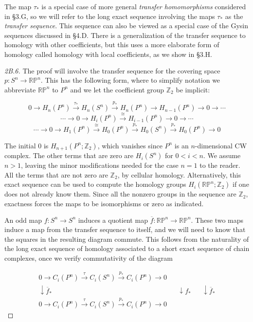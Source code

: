 The map $\tau_*$ is a special case of more general \textit{transfer homomorphisms} considered in \S3.G, so we will refer to the long exact sequence involving the maps $\tau_*$ as the \textit{transfer sequence}. This sequence can also be viewed as a special case of the Gysin sequences discussed in \S4.D. There is a generalization of the transfer sequence to homology with other coefficients, but this uses a more elaborate form of homology called homology with local coefficients, as we show in \S3.H.
\begin{proof}[2B.6]
 The proof will involve the transfer sequence for the covering space $p : S^n \to \mathbb{RP}^n$. This has the following form, where to simplify notation we abbreviate $\mathbb{RP}^n$ to $P^n$ and we let the coefficient group $\mathbb{Z}_2$ be implicit:

\[
0 \longrightarrow H_n(P^n) \xrightarrow{\tau_*} H_n(S^n) \xrightarrow{p_*} H_n(P^n) \longrightarrow H_{n-1}(P^n) \longrightarrow 0 \longrightarrow \cdots
\]
\[
\cdots \longrightarrow 0 \longrightarrow H_i(P^n) \xrightarrow{\cong} H_{i-1}(P^n) \longrightarrow 0 \longrightarrow \cdots
\]
\[
\cdots \longrightarrow 0 \longrightarrow H_1(P^n) \xrightarrow{\cong} H_0(P^n) \xrightarrow{p_*} H_0(S^n) \xrightarrow{p_*} H_0(P^n) \longrightarrow 0
\]

The initial $0$ is $H_{n+1}(P^n; \mathbb{Z}_2)$, which vanishes since $P^n$ is an $n$-dimensional CW complex. The other terms that are zero are $H_i(S^n)$ for $0 < i < n$. We assume $n > 1$, leaving the minor modifications needed for the case $n = 1$ to the reader. All the terms that are not zero are $\mathbb{Z}_2$, by cellular homology. Alternatively, this exact sequence can be used to compute the homology groups $H_i(\mathbb{RP}^n; \mathbb{Z}_2)$ if one does not already know them. Since all the nonzero groups in the sequence are $\mathbb{Z}_2$, exactness forces the maps to be isomorphisms or zero as indicated.

An odd map $f : S^n \to S^n$ induces a quotient map $\overline{f} : \mathbb{RP}^n \to \mathbb{RP}^n$. These two maps induce a map from the transfer sequence to itself, and we will need to know that the squares in the resulting diagram commute. This follows from the naturality of the long exact sequence of homology associated to a short exact sequence of chain complexes, once we verify commutativity of the diagram

\[
\begin{array}{ccccc}
0 \longrightarrow C_i(P^n) \xrightarrow{\tau} C_i(S^n) \xrightarrow{p_*} C_i(P^n) \longrightarrow 0 \\
\downarrow \overline{f}_* & & \downarrow f_* & & \downarrow \overline{f}_* \\
0 \longrightarrow C_i(P^n) \xrightarrow{\tau} C_i(S^n) \xrightarrow{p_*} C_i(P^n) \longrightarrow 0
\end{array}
\]


\end{proof}
